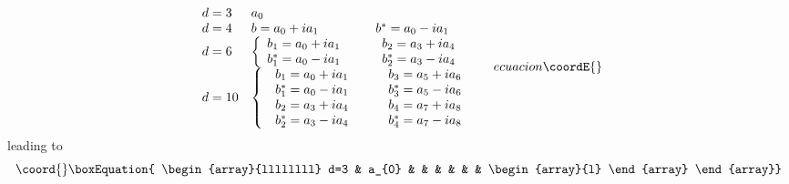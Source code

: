 \documentclass[a4paper,12pt]{book}
\begin{document}
\begin{itemize}
\begin{equation}
{\begin{array}{llll}
d=3 & a_{0} &  & 
\begin{array}{l}
\end{array}
\\ 
d=4 & b=a_{0}+ia_{1} & b^{*}=a_{0}-ia_{1} & 
\begin{array}{l}
\end{array}
\\ 
d=6 & \left\{ 
\begin{array}{l}
b_{1}=a_{0}+ia_{1} \\ 
b_{1}^{*}=a_{0}-ia_{1}
\end{array}
\right. & 
\begin{array}{l}
b_{2}=a_{3}+ia_{4} \\ 
b_{2}^{*}=a_{3}-ia_{4}
\end{array}
& 
\begin{array}{l}
\end{array}
\\ 
d=10 & \left\{ 
\begin{array}{c}
\begin{array}{l}
b_{1}=a_{0}+ia_{1} \\ 
b_{1}^{*}=a_{0}-ia_{1}
\end{array}
\\ 
\begin{array}{l}
b_{2}=a_{3}+ia_{4} \\ 
b_{2}^{*}=a_{3}-ia_{4}
\end{array}
\end{array}
\right. & 
\begin{array}{l}
\begin{array}{l}
b_{3}=a_{5}+ia_{6} \\ 
b_{3}^{*}=a_{5}-ia_{6}
\end{array}
\\ 
\begin{array}{l}
b_{4}=a_{7}+ia_{8} \\ 
b_{4}^{*}=a_{7}-ia_{8}
\end{array}
\end{array}
& 
\begin{array}{l}
\end{array}
\end{array}
}{ecuacion}\coordE{}\end{equation}
leading to \coordHE{}%
\begin{equation}\coord{}\boxEquation{
\begin{array}{llllllll}
d=3 & a_{0} &  &  &  &  &  & 
\begin{array}{l}
\end{array}

\end{array}}
\end{equation}
\end{itemize}
\end{document}
